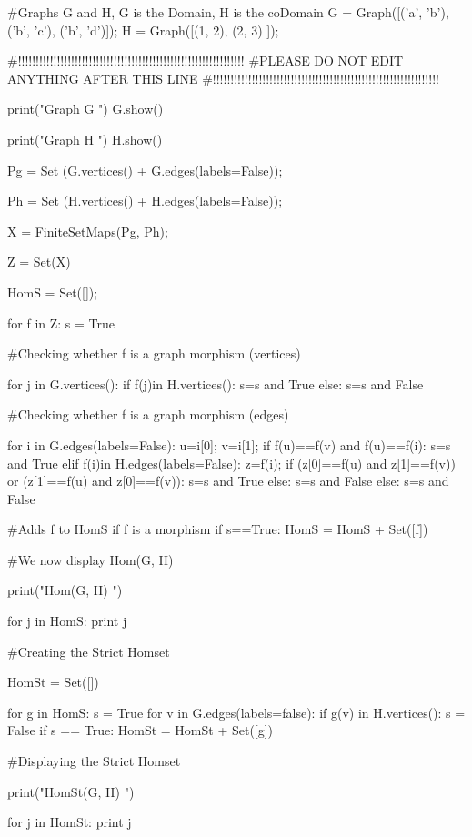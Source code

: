 \documentclass{ximera}
\begin{document}
\begin{sageCell}
#Graphs G and H, G is the Domain, H is the coDomain
G = Graph([('a', 'b'),('b', 'c'), ('b', 'd')]); 
H = Graph([(1, 2), (2, 3) ]); 

#!!!!!!!!!!!!!!!!!!!!!!!!!!!!!!!!!!!!!!!!!!!!!!!!!!!!!!!!!!!!!!!!
#PLEASE DO NOT EDIT ANYTHING AFTER THIS LINE
#!!!!!!!!!!!!!!!!!!!!!!!!!!!!!!!!!!!!!!!!!!!!!!!!!!!!!!!!!!!!!!!!

print("\n\n Graph G \n")
G.show()



print("\n\n Graph H \n\n")
H.show()


Pg = Set (G.vertices() + G.edges(labels=False)); 


Ph = Set (H.vertices() + H.edges(labels=False)); 

X = FiniteSetMaps(Pg, Ph); 

Z = Set(X)

HomS = Set([]); 

for f in Z:
    s = True

#Checking whether f is a graph morphism (vertices)

    for j in G.vertices():
        if f(j)in H.vertices():
            s=s and True
        else:
            s=s and False


#Checking whether f is a graph morphism (edges)

    for i in G.edges(labels=False):
        u=i[0];
        v=i[1];
        if f(u)==f(v) and f(u)==f(i):
            s=s and True
        elif f(i)in H.edges(labels=False):
            z=f(i);
            if (z[0]==f(u) and z[1]==f(v)) or (z[1]==f(u) and z[0]==f(v)):
                s=s and True
            else:
                s=s and False
        else: s=s and False

#Adds f to HomS if f is a morphism
    if s==True:
        HomS = HomS + Set([f])

#We now display Hom(G, H)

print("\n\n Hom(G, H) \n\n")


for j in HomS:
    print j

#Creating the Strict Homset

HomSt = Set([])

for g in HomS:
    s = True
    for v in G.edges(labels=false):
        if g(v) in H.vertices():
            s = False
    if s == True:
        HomSt = HomSt + Set([g])

#Displaying the Strict Homset

print("\n\n HomSt(G, H) \n\n")


for j in HomSt:
    print j
\end{sageCell}
\end{document}

